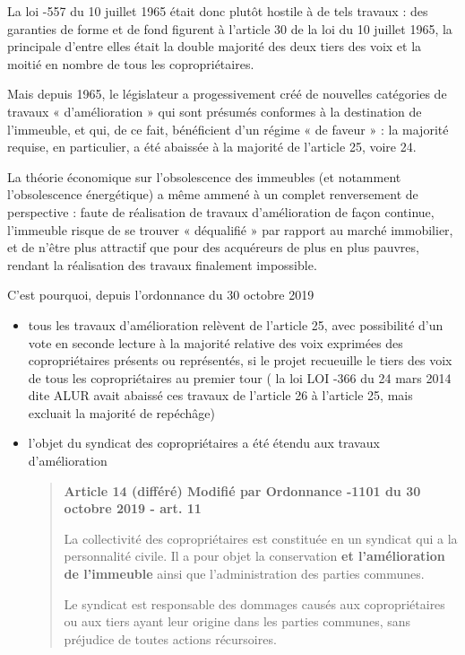 		La loi -557 du 10 juillet 1965 était donc plutôt hostile à de tels travaux : des garanties de forme et de fond figurent à l’article 30 de la loi du 10 juillet 1965, la principale d’entre elles était la double majorité des deux tiers des voix et la moitié en nombre de tous les copropriétaires.
		
		Mais depuis 1965, le législateur a progessivement créé de nouvelles catégories de travaux « d’amélioration » qui sont présumés conformes à la destination de l’immeuble, et qui, de ce fait, bénéficient d’un régime « de faveur » : la majorité requise, en particulier, a été abaissée à la majorité de l’article 25, voire 24.
		
		La théorie économique sur l’obsolescence des immeubles (et notamment l’obsolescence énergétique) a même ammené à un complet renversement de perspective : faute de réalisation de travaux d’amélioration de façon continue, l’immeuble risque de se trouver « déqualifié » par rapport au marché immobilier, et de n’être plus attractif que pour des acquéreurs de plus en plus pauvres, rendant la réalisation des travaux finalement impossible.
		
		C’est pourquoi, depuis l’ordonnance du 30 octobre 2019
		\begin{itemize}
			\item tous les travaux d’amélioration relèvent de l’article 25, avec possibilité d’un vote en seconde lecture à la majorité relative des voix exprimées des copropriétaires présents ou représentés, si le projet recueuille le tiers des voix de tous les copropriétaires au premier tour ( la loi LOI -366 du 24 mars 2014 dite ALUR avait abaissé ces travaux de l’article 26 à l’article 25, mais excluait la majorité de repéchâge)
		
			\item l’objet du syndicat des copropriétaires a été étendu aux travaux d’amélioration
			\begin{quote}
				{\bfseries Article 14 (différé) Modifié par Ordonnance -1101 du 30 octobre 2019 - art. 11}
				
				La collectivité des copropriétaires est constituée en un syndicat qui a la personnalité civile. \lips Il a pour objet la conservation \textbf{et l'amélioration de l'immeuble} ainsi que l'administration des parties communes.
				
				Le syndicat est responsable des dommages causés aux copropriétaires ou aux tiers ayant leur origine dans les parties communes, sans préjudice de toutes actions récursoires.
			\end{quote}
		\end{itemize}
		
